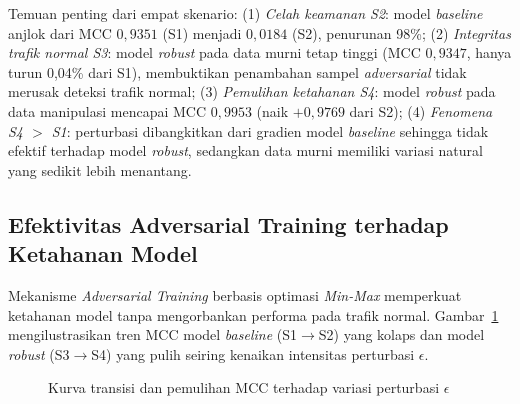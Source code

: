\documentclass[10pt,twocolumn,a4paper]{extarticle}
\begin{document}
Temuan penting dari empat skenario: (1) \textit{Celah keamanan S2}: model \textit{baseline} anjlok dari MCC $0{,}9351$ (S1) menjadi $0{,}0184$ (S2), penurunan 98\%; (2) \textit{Integritas trafik normal S3}: model \textit{robust} pada data murni tetap tinggi (MCC $0{,}9347$, hanya turun 0,04\% dari S1), membuktikan penambahan sampel \textit{adversarial} tidak merusak deteksi trafik normal; (3) \textit{Pemulihan ketahanan S4}: model \textit{robust} pada data manipulasi mencapai MCC $0{,}9953$ (naik $+0{,}9769$ dari S2); (4) \textit{Fenomena S4 $>$ S1}: perturbasi dibangkitkan dari gradien model \textit{baseline} sehingga tidak efektif terhadap model \textit{robust}, sedangkan data murni memiliki variasi natural yang sedikit lebih menantang.

\subsection{Efektivitas Adversarial Training terhadap Ketahanan Model}
Mekanisme \textit{Adversarial Training} berbasis optimasi \textit{Min-Max} memperkuat ketahanan model tanpa mengorbankan performa pada trafik normal. Gambar~\ref{fig:mcc_recovery} mengilustrasikan tren MCC model \textit{baseline} (S1$\rightarrow$S2) yang kolaps dan model \textit{robust} (S3$\rightarrow$S4) yang pulih seiring kenaikan intensitas perturbasi $\epsilon$.

\begin{figure}[htbp]
\centering
{}
\caption{Kurva transisi dan pemulihan MCC terhadap variasi perturbasi $\epsilon$}
\label{fig:mcc_recovery}
\end{figure}
\end{document}
